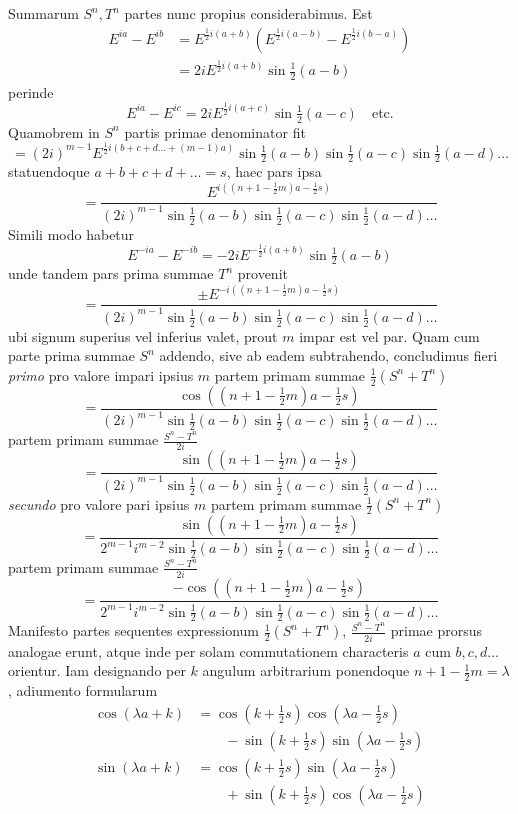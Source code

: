 Summarum $S^n,T^n$ partes nunc propius considerabimus. Est
\[
\begin{aligned}E^{ia}-E^{ib}&=E^{\frac12i(a+b)}(E^{\frac12i(a-b)}-E^{\frac12i(b-a)})\\
&=2iE^{\frac12i(a+b)}\sin\tfrac12(a-b)\end{aligned}
\]
perinde
\[
E^{ia}-E^{ic}=2iE^{\frac12i(a+c)}\sin\tfrac12(a-c)\quad\text{etc.}
\]
Quamobrem in $S^n$ partis primae denominator fit
\[
=(2i)^{m-1}E^{\frac12i(b+c+d\ldots+(m-1)a)}\sin\tfrac12(a-b)\sin\tfrac12(a-c)\sin\tfrac12(a-d)\ldots
\]
statuendoque $a+b+c+d+\ldots=s$, haec pars ipsa
\[
=\frac{E^{i((n+1-\frac12m)a-\frac12s)}}{(2i)^{m-1}\sin\tfrac12(a-b)\sin\tfrac12(a-c)\sin\tfrac12(a-d)\ldots}
\]
Simili modo habetur
\[
E^{-ia}-E^{-ib}=-2iE^{-\frac12i(a+b)}\sin\tfrac12(a-b)
\]
unde tandem pars prima summae $T^n$ provenit
\[
=\frac{\pm E^{-i((n+1-\frac12m)a-\frac12s)}}{(2i)^{m-1}\sin\tfrac12(a-b)\sin\tfrac12(a-c)\sin\tfrac12(a-d)\ldots}
\]
ubi signum superius vel inferius valet, prout $m$ impar est vel par. Quam cum parte prima summae $S^n$ addendo, sive ab eadem subtrahendo, concludimus fieri \textit{primo} pro valore impari ipsius $m$ partem primam summae $\frac12(S^n+T^n)$
\[
=\frac{\cos((n+1-\frac12m)a-\frac12s)}{(2i)^{m-1}\sin\tfrac12(a-b)\sin\tfrac12(a-c)\sin\tfrac12(a-d)\ldots}
\]
partem primam summae $\frac{S^n-T^n}{2i}$
\[
=\frac{\sin((n+1-\frac12m)a-\frac12s)}{(2i)^{m-1}\sin\tfrac12(a-b)\sin\tfrac12(a-c)\sin\tfrac12(a-d)\ldots}
\]
\textit{secundo} pro valore pari ipsius $m$ partem primam summae $\frac12(S^n+T^n)$
\[
=\frac{\sin((n+1-\frac12m)a-\frac12s)}{2^{m-1}i^{m-2}\sin\tfrac12(a-b)\sin\tfrac12(a-c)\sin\tfrac12(a-d)\ldots}
\]
partem primam summae $\frac{S^n-T^n}{2i}$
\[
=\frac{-\cos((n+1-\frac12m)a-\frac12s)}{2^{m-1}i^{m-2}\sin\tfrac12(a-b)\sin\tfrac12(a-c)\sin\tfrac12(a-d)\ldots}
\]
Manifesto partes sequentes expressionum $\frac12(S^n+T^n)$, $\frac{S^n-T^n}{2i}$ primae prorsus analogae erunt, atque inde per solam commutationem characteris $a$ cum $b,c,d\ldots$ orientur. Iam designando per $k$ angulum arbitrarium ponendoque $n+1-\frac12m=\lambda$, adiumento formularum
\[
\begin{aligned}
\cos(\lambda a+k)&=\cos(k+\tfrac12s)\cos(\lambda a-\tfrac12s)\\&\qquad-\sin(k+\tfrac12s)\sin(\lambda a-\tfrac12s)\\
\sin(\lambda a+k)&=\cos(k+\tfrac12s)\sin(\lambda a-\tfrac12s)\\&\qquad+\sin(k+\tfrac12s)\cos(\lambda a-\tfrac12s)
\end{aligned}
\]
